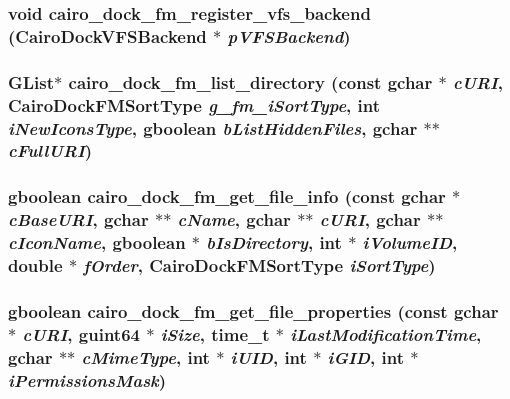\subsubsection{\setlength{\rightskip}{0pt plus 5cm}void cairo\_\-dock\_\-fm\_\-register\_\-vfs\_\-backend ({\bf CairoDockVFSBackend} $\ast$ {\em pVFSBackend})}\label{cairo-dock-file-manager_8h_550e7883243efc448cf21a3a45d3351f}


\subsubsection{\setlength{\rightskip}{0pt plus 5cm}GList$\ast$ cairo\_\-dock\_\-fm\_\-list\_\-directory (const gchar $\ast$ {\em cURI}, {\bf CairoDockFMSortType} {\em g\_\-fm\_\-iSortType}, int {\em iNewIconsType}, gboolean {\em bListHiddenFiles}, gchar $\ast$$\ast$ {\em cFullURI})}\label{cairo-dock-file-manager_8h_83f7ed2d2f2bca5b47469a3966404c8c}


\subsubsection{\setlength{\rightskip}{0pt plus 5cm}gboolean cairo\_\-dock\_\-fm\_\-get\_\-file\_\-info (const gchar $\ast$ {\em cBaseURI}, gchar $\ast$$\ast$ {\em cName}, gchar $\ast$$\ast$ {\em cURI}, gchar $\ast$$\ast$ {\em cIconName}, gboolean $\ast$ {\em bIsDirectory}, int $\ast$ {\em iVolumeID}, double $\ast$ {\em fOrder}, {\bf CairoDockFMSortType} {\em iSortType})}\label{cairo-dock-file-manager_8h_97ca80266ac95bba9728c4ced4c791e0}


\subsubsection{\setlength{\rightskip}{0pt plus 5cm}gboolean cairo\_\-dock\_\-fm\_\-get\_\-file\_\-properties (const gchar $\ast$ {\em cURI}, guint64 $\ast$ {\em iSize}, time\_\-t $\ast$ {\em iLastModificationTime}, gchar $\ast$$\ast$ {\em cMimeType}, int $\ast$ {\em iUID}, int $\ast$ {\em iGID}, int $\ast$ {\em iPermissionsMask})}\label{cairo-dock-file-manager_8h_a7131c9e457f3a02346f578bb4ee590d}


